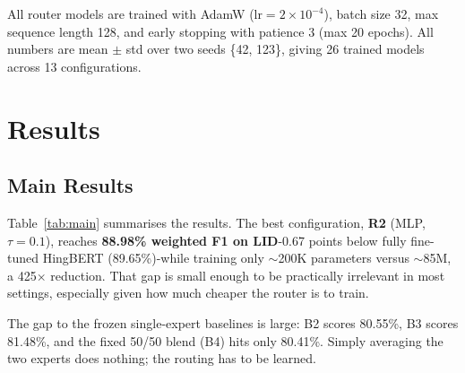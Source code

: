 \documentclass[conference]{IEEEtran}
\begin{document}
All router models are trained with AdamW ($\text{lr}{=}2{\times}10^{-4}$), batch size 32, max sequence length 128, and early stopping with patience 3 (max 20 epochs). All numbers are mean $\pm$ std over two seeds \{42, 123\}, giving 26 trained models across 13 configurations.

\section{Results}

\subsection{Main Results}

Table~\ref{tab:main} summarises the results. The best configuration, \textbf{R2} (MLP, $\tau{=}0.1$), reaches \textbf{88.98\% weighted F1 on LID}-0.67 points below fully fine-tuned HingBERT (89.65\%)-while training only $\sim$200K parameters versus $\sim$85M, a 425$\times$ reduction. That gap is small enough to be practically irrelevant in most settings, especially given how much cheaper the router is to train.

The gap to the frozen single-expert baselines is large: B2 scores 80.55\%, B3 scores 81.48\%, and the fixed 50/50 blend (B4) hits only 80.41\%. Simply averaging the two experts does nothing; the routing has to be learned.
\end{document}
